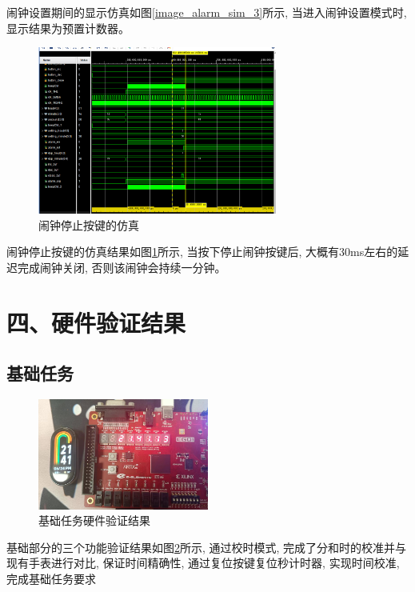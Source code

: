 \documentclass{article}
\newcommand{\fourhao}{\fontsize{14pt}{\baselineskip}\selectfont} %
\newcommand{\xiaosihao}{\fontsize{12pt}{\baselineskip}\selectfont} %
\begin{document}
闹钟设置期间的显示仿真如图\ref{image_alarm_sim_3}所示, 当进入闹钟设置模式时, 显示结果为预置计数器。
\begin{figure}[htbp]
    \centering
    \includegraphics[width=0.7\textwidth]{image/2024-06-25-22-16-52.png}
    \caption{闹钟停止按键的仿真}
    \label{image_alarm_sim_4}
\end{figure}
闹钟停止按键的仿真结果如图\ref{image_alarm_sim_4}所示, 当按下停止闹钟按键后, 大概有30ms左右的延迟完成闹钟关闭, 否则该闹钟会持续一分钟。
\section*{\fourhao 四、硬件验证结果}
\xiaosihao
{}
\subsection*{基础任务}
\begin{figure}[H]
    \centering
    \includegraphics[width=0.5\textwidth]{image/2024-06-24-21-42-35.png}
    \caption{基础任务硬件验证结果}
    \label{image_verify_1}
\end{figure}
基础部分的三个功能验证结果如图\ref{image_verify_1}所示, 通过校时模式, 完成了分和时的校准并与现有手表进行对比, 
保证时间精确性, 通过复位按键复位秒计时器, 实现时间校准, 完成基础任务要求\\
\end{document}
